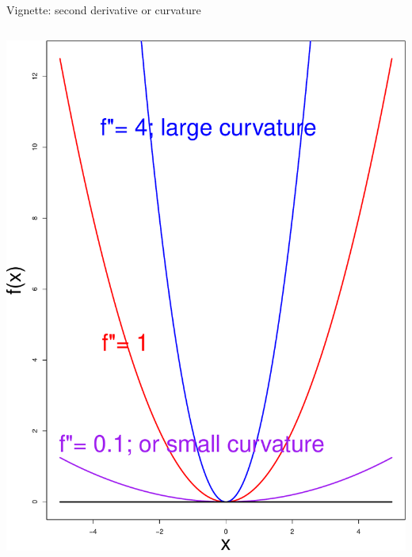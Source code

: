 \documentclass[ignorenonframetext,aspectratio=169]{beamer}
\begin{document}
\begin{frame}{Vignette: second derivative or curvature}
\begin{columns}
\begin{column}{0.3\textwidth}
\begin{center}\includegraphics[width=1\linewidth]{lecture9_files/figure-beamer/unnamed-chunk-3-1} \end{center}
\end{column}
\end{columns}

\end{frame}
\end{document}
